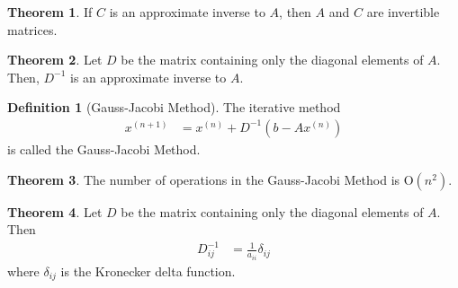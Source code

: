 \documentclass[fleqn, a4paper, 12pt, twoside, titlepage]{article}
\theoremstyle{definition}
\newtheorem{definition}{Definition}
\theoremstyle{theorem}
\newtheorem{theorem}{Theorem}
\begin{document}
\begin{theorem}
	If $C$ is an approximate inverse to $A$, then $A$ and $C$ are invertible matrices.
\end{theorem}

\begin{theorem}
	Let $D$ be the matrix containing only the diagonal elements of $A$.
	Then, $D^{-1}$ is an approximate inverse to $A$.
\end{theorem}

\begin{definition}[Gauss-Jacobi Method]
	The iterative method
	\begin{align*}
		x^{(n + 1)} &= x^{(n)} + D^{-1} \left( b - A x^{(n)} \right)
	\end{align*}
	is called the Gauss-Jacobi Method.
\end{definition}

\begin{theorem}
	The number of operations in the Gauss-Jacobi Method is $\mathrm{O}\left( n^2 \right)$.
\end{theorem}

\begin{theorem}
	Let $D$ be the matrix containing only the diagonal elements of $A$.
	Then
	\begin{align*}
		D^{-1}_{i j} &= \frac{1}{a_{i i}} \delta_{i j}
	\end{align*}
	where $\delta_{i j}$ is the Kronecker delta function.
\end{theorem}

\begin{algorithm}[H]
	\caption{Gauss-Jacobi Method}
	\begin{algorithmic}[1]
	\end{algorithmic}
\end{algorithm}

\begin{algorithm}[H]
	\caption{Gauss-Seidel Method}
	\begin{algorithmic}[1]
	\end{algorithmic}
\end{algorithm}
\end{document}
